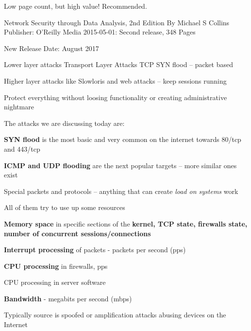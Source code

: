 \documentclass[Screen16to9,17pt]{foils}
\begin{document}


Low page count, but high value! Recommended.

Network Security through Data Analysis, 2nd Edition
By Michael S Collins
Publisher: O'Reilly Media
2015-05-01: Second release, 348 Pages

New Release Date: August 2017






\begin{list2}
\item Lower layer attacks Transport Layer Attacks TCP SYN flood -- packet based
\item Higher layer attacks like Slowloris and web attacks -- keep sessions running
\item Protect everything without loosing functionality or creating administrative nightmare
\end{list2}


The attacks we are discussing today are:
\begin{list2}
\item {\bf SYN flood} is the most basic and very common on the internet towards 80/tcp and 443/tcp
\item {\bf ICMP and UDP flooding} are the next popular targets -- more similar ones exist
\item Special packets and protocols -- anything that can create \emph{load on systems} work
\item All of them try to use up some resources
\begin{list2}
\item {\bf Memory space} in specific sections of the {\bf kernel, TCP state, firewalls state, number of concurrent sessions/connections}
\item {\bf Interrupt processing} of packets - packets per second (pps)
\item {\bf CPU processing} in firewalls, pps
\item CPU processing in server software
\item {\bf Bandwidth} - megabits per second (mbps)
\item Typically source is spoofed or amplification attacks abusing devices on the Internet
\end{list2}
\end{list2}
\end{document}
